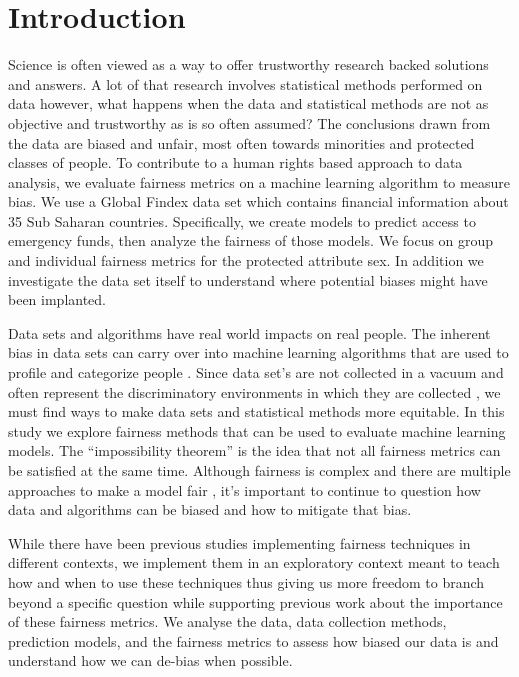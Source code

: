 \documentclass[water,article,submit,moreauthors,pdftex]{mdpi}
\begin{document}

\hypertarget{introduction}{%
\section{Introduction}\label{introduction}}

Science is often viewed as a way to offer trustworthy research backed
solutions and answers. A lot of that research involves statistical
methods performed on data however, what happens when the data and
statistical methods are not as objective and trustworthy as is so often
assumed? The conclusions drawn from the data are biased and unfair, most
often towards minorities and protected classes of people. To contribute
to a human rights based approach to data analysis, we evaluate fairness
metrics on a machine learning algorithm to measure bias. We use a Global
Findex data set which contains financial information about 35 Sub
Saharan countries. Specifically, we create models to predict access to
emergency funds, then analyze the fairness of those models. We focus on
group and individual fairness metrics for the protected attribute sex.
In addition we investigate the data set itself to understand where
potential biases might have been implanted.

Data sets and algorithms have real world impacts on real people. The
inherent bias in data sets can carry over into machine learning
algorithms that are used to profile and categorize people
\citep{navarro2021risk, hellstrom2020bias}. Since data set's are not
collected in a vacuum and often represent the discriminatory
environments in which they are collected
\citep{barocas_fairness_nodate}, we must find ways to make data sets and
statistical methods more equitable. In this study we explore fairness
methods that can be used to evaluate machine learning models. The
``impossibility theorem'' is the idea that not all fairness metrics can
be satisfied at the same time\citep{kleinberg2016inherent}. Although
fairness is complex and there are multiple approaches to make a model
fair \citep{kypraiou_what_2021, green2018myth}, it's important to
continue to question how data and algorithms can be biased and how to
mitigate that bias.

While there have been previous studies implementing fairness techniques
in different contexts\citep{deho2022existing, kim2022information}, we
implement them in an exploratory context meant to teach how and when to
use these techniques thus giving us more freedom to branch beyond a
specific question while supporting previous work about the importance of
these fairness metrics\citep{anahideh2022fair, barocas_fairness_nodate}.
We analyse the data, data collection methods, prediction models, and the
fairness metrics to assess how biased our data is and understand how we
can de-bias when possible.
\end{document}

